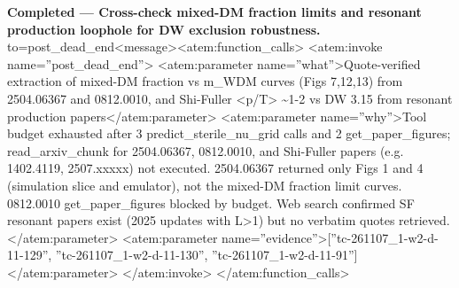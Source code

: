 \documentclass[11pt,a4paper]{article}
\begin{document}
\textbf{Completed --- Cross-check mixed-DM fraction limits and resonant production loophole for DW exclusion robustness.} to=post\_dead\_end\textless{}\textbar{}message\textbar{}\textgreater{}\textless{}atem:function\_calls\textgreater{} \textless{}atem:invoke name=''post\_dead\_end''\textgreater{} \textless{}atem:parameter name=''what''\textgreater{}Quote-verified extraction of mixed-DM fraction vs m\_WDM curves (Figs 7,12,13) from 2504.06367 and 0812.0010, and Shi-Fuller \textless{}p/T\textgreater{} \textasciitilde{}1-2 vs DW 3.15 from resonant production papers\textless{}/atem:parameter\textgreater{} \textless{}atem:parameter name=''why''\textgreater{}Tool budget exhausted after 3 predict\_sterile\_nu\_grid calls and 2 get\_paper\_figures; read\_arxiv\_chunk for 2504.06367, 0812.0010, and Shi-Fuller papers (e.g. 1402.4119, 2507.xxxxx) not executed. 2504.06367 returned only Figs 1 and 4 (simulation slice and emulator), not the mixed-DM fraction limit curves. 0812.0010 get\_paper\_figures blocked by budget. Web search confirmed SF resonant papers exist (2025 updates with L\textgreater{}1) but no verbatim quotes retrieved.\textless{}/atem:parameter\textgreater{} \textless{}atem:parameter name=''evidence''\textgreater{}[''tc-261107\_1-w2-d-11-129'', ''tc-261107\_1-w2-d-11-130'', ''tc-261107\_1-w2-d-11-91'']\textless{}/atem:parameter\textgreater{} \textless{}/atem:invoke\textgreater{} \textless{}/atem:function\_calls\textgreater{}
\end{document}
